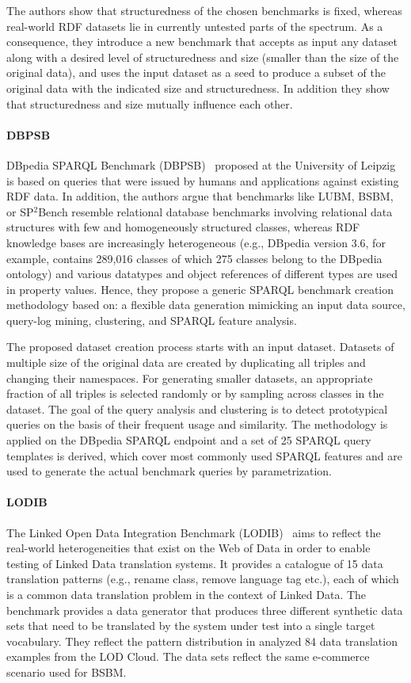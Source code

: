 The authors show that structuredness of the chosen benchmarks is fixed, whereas real-world RDF datasets lie in currently untested parts of the spectrum. As a consequence, they introduce a new benchmark that accepts as input any dataset along with a desired level of structuredness and size (smaller than the size of the original data), and uses the input dataset as a seed to produce a subset of the original data with the indicated size and structuredness. In addition they show that structuredness and size mutually influence each other.


\paragraph{DBPSB} DBpedia SPARQL Benchmark (DBPSB)~\cite{Morsey2011,Morsey:2012:UBR:2900929.2901031} proposed at the University of Leipzig is based on queries that were issued by humans and applications
against existing RDF data. In addition, the authors argue that benchmarks like LUBM, BSBM, or SP$^2$Bench resemble relational database benchmarks involving relational data structures with few and homogeneously structured classes, whereas RDF knowledge bases are increasingly heterogeneous (e.g., DBpedia version 3.6, for example, contains 289,016 classes of which 275 classes belong
to the DBpedia ontology) and various datatypes and object references of different types are
used in property values. Hence, they propose a generic SPARQL benchmark creation methodology based on: a flexible data generation mimicking an input data source, query-log mining, clustering, and SPARQL feature analysis.

The proposed dataset creation process starts with an input dataset. Datasets of multiple size of the original data are created by duplicating all triples and changing their namespaces.  For generating smaller datasets, an appropriate fraction of all triples is selected randomly or by sampling across classes in the dataset. The goal of the query analysis and clustering is to detect prototypical queries on the basis of their frequent usage and similarity. The methodology is applied on the DBpedia SPARQL endpoint and a set of 25 SPARQL query templates is derived, which cover most commonly used SPARQL features and are used to generate the actual benchmark queries by parametrization.

\paragraph{LODIB} The Linked Open Data Integration Benchmark (LODIB)~\cite{DBLP:conf/www/RiveroSBR12} aims to reflect the real-world heterogeneities that exist on the Web of Data in order to enable testing of Linked Data translation systems. It provides a catalogue of 15 data translation patterns (e.g., rename class, remove language tag etc.), each of which is a common data translation problem in the context of Linked Data. The benchmark provides a data generator that produces three different synthetic data sets that need to be translated
by the system under test into a single target vocabulary. They  reflect the pattern distribution in analyzed 84 data translation examples from the LOD Cloud. The data sets reflect the same e-commerce scenario used for BSBM.


